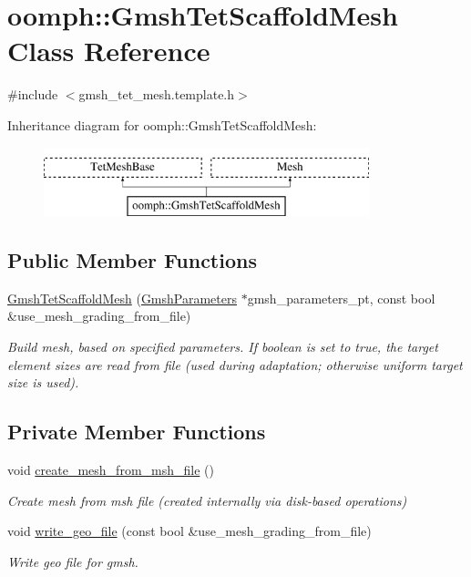 \hypertarget{classoomph_1_1GmshTetScaffoldMesh}{}\section{oomph\+:\+:Gmsh\+Tet\+Scaffold\+Mesh Class Reference}
\label{classoomph_1_1GmshTetScaffoldMesh}


{\ttfamily \#include $<$gmsh\+\_\+tet\+\_\+mesh.\+template.\+h$>$}

Inheritance diagram for oomph\+:\+:Gmsh\+Tet\+Scaffold\+Mesh\+:\begin{figure}[H]
\begin{center}
\leavevmode
\includegraphics[height=2.000000cm]{classoomph_1_1GmshTetScaffoldMesh}
\end{center}
\end{figure}
\subsection*{Public Member Functions}
\begin{DoxyCompactItemize}
\item 
\hyperlink{classoomph_1_1GmshTetScaffoldMesh_a16430cc97edb1f4ec0eab6cfa5b94563}{Gmsh\+Tet\+Scaffold\+Mesh} (\hyperlink{classoomph_1_1GmshParameters}{Gmsh\+Parameters} $\ast$gmsh\+\_\+parameters\+\_\+pt, const bool \&use\+\_\+mesh\+\_\+grading\+\_\+from\+\_\+file)
\begin{DoxyCompactList}\small\item\em Build mesh, based on specified parameters. If boolean is set to true, the target element sizes are read from file (used during adaptation; otherwise uniform target size is used). \end{DoxyCompactList}\end{DoxyCompactItemize}
\subsection*{Private Member Functions}
\begin{DoxyCompactItemize}
\item 
void \hyperlink{classoomph_1_1GmshTetScaffoldMesh_a13c5fa9a126fc1707534031826d8f43f}{create\+\_\+mesh\+\_\+from\+\_\+msh\+\_\+file} ()
\begin{DoxyCompactList}\small\item\em Create mesh from msh file (created internally via disk-\/based operations) \end{DoxyCompactList}\item 
void \hyperlink{classoomph_1_1GmshTetScaffoldMesh_a20ba8fb06fe0264c4ba0b586b104f969}{write\+\_\+geo\+\_\+file} (const bool \&use\+\_\+mesh\+\_\+grading\+\_\+from\+\_\+file)
\begin{DoxyCompactList}\small\item\em Write geo file for gmsh. \end{DoxyCompactList}\end{DoxyCompactItemize}
